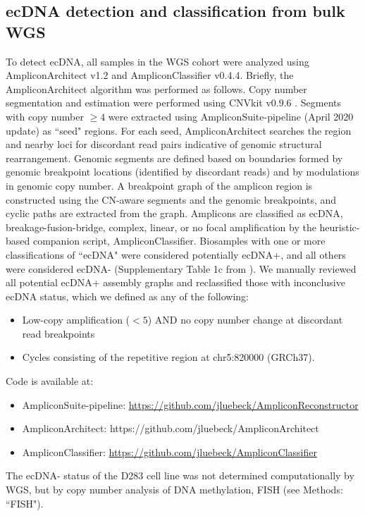 \subsection{ecDNA detection and classification from bulk WGS}
To detect ecDNA, all samples in the WGS cohort were analyzed using AmpliconArchitect \cite{AA} v1.2 and AmpliconClassifier \cite{Kim_2020} v0.4.4. Briefly, the AmpliconArchitect algorithm was performed as follows. Copy number segmentation and estimation were performed using CNVkit v0.9.6 \cite{cnvkit}. Segments with copy number $\geq 4$ were extracted using AmpliconSuite-pipeline (April 2020 update) as ``seed" regions. For each seed, AmpliconArchitect searches the region and nearby loci for discordant read pairs indicative of genomic structural rearrangement. Genomic segments are defined based on boundaries formed by genomic breakpoint locations (identified by discordant reads) and by modulations in genomic copy number. A breakpoint graph of the amplicon region is constructed using the CN-aware segments and the genomic breakpoints, and cyclic paths are extracted from the graph.  Amplicons are classified as ecDNA, breakage-fusion-bridge, complex, linear, or no focal amplification by the heuristic-based companion script, AmpliconClassifier. Biosamples with one or more classifications of ``ecDNA" were considered potentially ecDNA+, and all others were considered ecDNA- (Supplementary Table 1c from \cite{Chapman}). We manually reviewed all potential ecDNA+ assembly graphs and reclassified those with inconclusive ecDNA status, which we defined as any of the following:
\begin{itemize}
    \item Low-copy amplification ($<5$) AND no copy number change at discordant read breakpoints
    \item Cycles consisting of the repetitive region at chr5:820000 (GRCh37).
\end{itemize}
Code is available at:
\begin{itemize}
    \item AmpliconSuite-pipeline: \url{https://github.com/jluebeck/AmpliconReconstructor}
    \item AmpliconArchitect: {https://github.com/jluebeck/AmpliconArchitect} 
    \item AmpliconClassifier: \url{https://github.com/jluebeck/AmpliconClassifier} 
\end{itemize}
The ecDNA- status of the D283 cell line was not determined computationally by WGS, but by copy number analysis of DNA methylation, FISH (see Methods: ``FISH").
